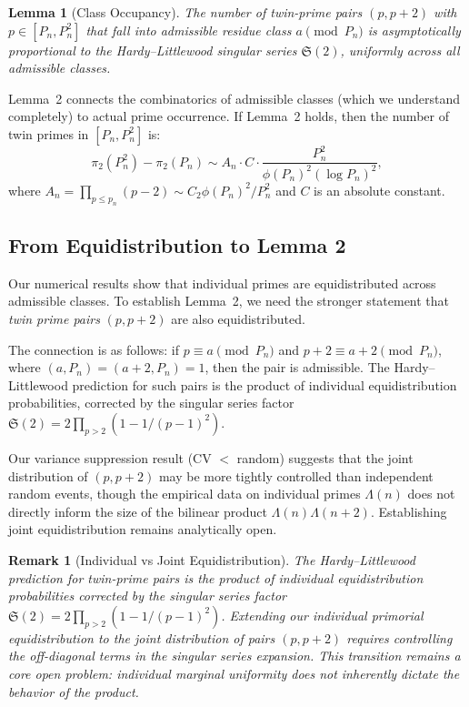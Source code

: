 \documentclass[11pt]{article}
\newtheorem{lemma}{Lemma}
\newtheorem{remark}{Remark}
\begin{document}
\begin{lemma}[Class Occupancy]\label{lem:occupancy}
The number of twin-prime pairs $(p, p+2)$ with $p \in [P_n, P_n^2]$
that fall into admissible residue class $a \pmod{P_n}$ is
asymptotically proportional to the Hardy--Littlewood singular
series $\mathfrak{S}(2)$, uniformly across all admissible classes.
\end{lemma}

Lemma~2 connects the combinatorics of admissible classes (which we
understand completely) to actual prime occurrence. If Lemma~2 holds,
then the number of twin primes in $[P_n, P_n^2]$ is:
\begin{equation}
\pi_2(P_n^2) - \pi_2(P_n) \sim A_n \cdot C \cdot
\frac{P_n^2}{\phi(P_n)^2 (\log P_n)^2},
\end{equation}
where $A_n = \prod_{p \leq p_n}(p-2) \sim C_2 \phi(P_n)^2/P_n^2$
and $C$ is an absolute constant.

\subsection{From Equidistribution to Lemma 2}

Our numerical results show that individual primes are equidistributed
across admissible classes. To establish Lemma~2, we need the stronger
statement that \emph{twin prime pairs} $(p, p+2)$ are also
equidistributed.

The connection is as follows: if $p \equiv a \pmod{P_n}$ and
$p+2 \equiv a+2 \pmod{P_n}$, where $(a, P_n)=(a+2, P_n)=1$, then the
pair is admissible. The Hardy--Littlewood prediction for such pairs is
the product of individual equidistribution probabilities, corrected by
the singular series factor $\mathfrak{S}(2) = 2\prod_{p>2}(1 - 1/(p-1)^2)$.

Our variance suppression result (CV $<$ random) suggests that the
joint distribution of $(p, p+2)$ may be more tightly controlled than
independent random events, though the empirical data on individual primes
$\Lambda(n)$ does not directly inform the size of the bilinear product
$\Lambda(n)\Lambda(n+2)$. Establishing joint equidistribution remains
analytically open.
\begin{remark}[Individual vs Joint Equidistribution]
The Hardy--Littlewood prediction for twin-prime pairs is the product of
individual equidistribution probabilities corrected by the singular series
factor $\mathfrak{S}(2) = 2\prod_{p>2}(1 - 1/(p-1)^2)$. Extending our
individual primorial equidistribution to the joint distribution of pairs
$(p, p+2)$ requires controlling the off-diagonal terms in the singular
series expansion. This transition remains a core open problem: individual
marginal uniformity does not inherently dictate the behavior of the
product.

\end{remark}
\end{document}
